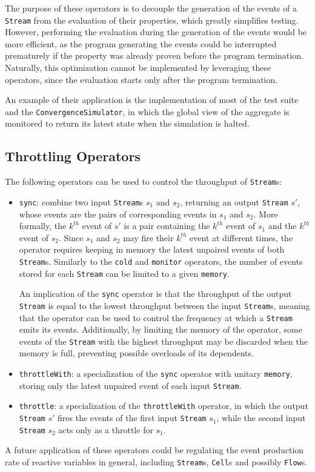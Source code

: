 The purpose of these operators is to decouple the generation of the events of a
\texttt{Stream} from the evaluation of their properties, which greatly
simplifies testing. However, performing the evaluation during the generation of
the events would be more efficient, as the program generating the events could
be interrupted prematurely if the property was already proven before the
program termination. Naturally, this optimization cannot be implemented by
leveraging these operators, since the evaluation starts only after the program
termination.

An example of their application is the implementation of most of the test suite
and the \texttt{ConvergenceSim\-ulator}, in which the global view of the
aggregate is monitored to return its latest state when the simulation is
halted.

\subsection{Throttling Operators}

The following operators can be used to control the throughput of
\texttt{Stream}s:
\begin{itemize}
  \item \texttt{sync}: combine two input \texttt{Stream}s $s_1$ and $s_2$,
        returning an output \texttt{Stream} $s'$, whose events are the pairs of
        corresponding events in $s_1$ and $s_2$. More formally, the $k^{th}$
        event of $s'$ is a pair containing the $k^{th}$ event of $s_1$ and the
        $k^{th}$ event of $s_2$. Since $s_1$ and $s_2$ may fire their $k^{th}$
        event at different times, the operator requires keeping in memory the
        latest unpaired events of both \texttt{Stream}s. Similarly to the
        \texttt{cold} and \texttt{monitor} operators, the number of events
        stored for each \texttt{Stream} can be limited to a given
        \texttt{memory}.

        An implication of the \texttt{sync} operator is that the throughput of
        the output \texttt{Stream} is equal to the lowest throughput between
        the input \texttt{Stream}s, meaning that the operator can be used to
        control the frequency at which a \texttt{Stream} emits its events.
        Additionally, by limiting the memory of the operator, some events of
        the \texttt{Stream} with the highest throughput may be discarded when
        the memory is full, preventing possible overloads of its dependents.
  \item \texttt{throttleWith}: a specialization of the \texttt{sync} operator
        with unitary \texttt{memory}, storing only the latest unpaired event of
        each input \texttt{Stream}.
  \item \texttt{throttle}: a specialization of the \texttt{throttleWith}
        operator, in which the output \texttt{Stream} $s'$ fires the events of
        the first input \texttt{Stream} $s_1$, while the second input
        \texttt{Stream} $s_2$ acts only as a throttle for $s_1$.
\end{itemize}

A future application of these operators could be regulating the event
production rate of reactive variables in general, including \texttt{Stream}s,
\texttt{Cell}s and possibly \texttt{Flow}s.

